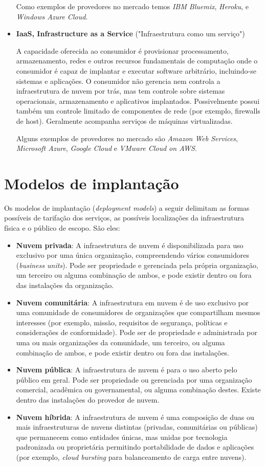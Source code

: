 \begin{itemize}
			Como exemplos de provedores no mercado temos \textit{IBM Bluemix}, \textit{Heroku}, e \textit{Windows Azure Cloud}.
		\item
			\textbf{IaaS, Infrastructure as a Service} ("Infraestrutura como um serviço") 

			A capacidade oferecida ao consumidor é provisionar processamento, armazenamento, redes e outros recursos fundamentais de computação onde o consumidor é capaz de implantar e executar software arbitrário, incluindo-se sistemas e aplicações. O consumidor não gerencia nem controla a infraestrutura de nuvem por trás, mas tem controle sobre sistemas operacionais, armazenamento e aplicativos implantados. Possivelmente possui também um controle limitado de componentes de rede (por exemplo, firewalls de host). Geralmente acompanha serviços de máquinas virtualizadas.

			Alguns exemplos de provedores no mercado são \textit{Amazon Web Services}, \textit{Microsoft Azure}, \textit{Google Cloud} e \textit{VMware Cloud on AWS}. 
	\end{itemize}

\section{Modelos de implantação}
	Os modelos de implantação (\textit{deployment models}) a seguir delimitam as formas possíveis de tarifação dos serviços, as possíveis localizações da infraestrutura física e o público de escopo. São eles:

	\begin{itemize}
		\item
			\textbf{Nuvem privada}: A infraestrutura de nuvem é disponibilizada para uso exclusivo por uma única organização, compreendendo vários consumidores (\textit{business units}). Pode ser propriedade e gerenciada pela própria organização, um terceiro ou alguma combinação de ambos, e pode existir dentro ou fora das instalações da organização.
		\item
			\textbf{Nuvem comunitária}: A infraestrutura em nuvem é de uso exclusivo por uma comunidade de consumidores de organizações que compartilham mesmos interesses (por exemplo, missão, requisitos de segurança, políticas e considerações de conformidade). Pode ser de propriedade e administrada por uma ou mais organizações da comunidade, um terceiro, ou alguma combinação de ambos, e pode existir dentro ou fora das instalações.
		\item
			\textbf{Nuvem pública}: A infraestrutura de nuvem é para o uso aberto pelo público em geral. Pode ser propriedade ou gerenciada por uma organização comercial, acadêmica ou governamental, ou alguma combinação destes. Existe dentro das instalações do provedor de nuvem.
		\item
			\textbf{Nuvem híbrida}: A infraestrutura de nuvem é uma composição de duas ou mais infraestruturas de nuvens distintas (privadas, comunitárias ou públicas) que permanecem como entidades únicas, mas unidas por tecnologia padronizada ou proprietária permitindo portabilidade de dados e aplicações (por exemplo, \textit{cloud bursting} para balanceamento de carga entre nuvens).
	\end{itemize}

